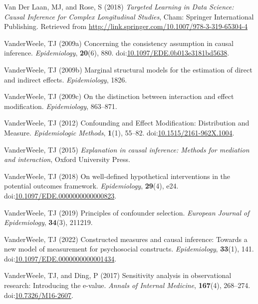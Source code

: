 \documentclass[
  singlecolumn]{article}
\newlength{\cslhangindent}
\newenvironment{CSLReferences}[2] %
 {\begin{list}{}{%
  \setlength{\itemindent}{0pt}
  \setlength{\leftmargin}{0pt}
  \setlength{\parsep}{0pt}
  \ifodd #1
   \setlength{\leftmargin}{\cslhangindent}
   \setlength{\itemindent}{-1\cslhangindent}
  \fi
  \setlength{\itemsep}{#2\baselineskip}}}
 {\end{list}}
\begin{document}
\begin{CSLReferences}{1}{0}
Van Der Laan, MJ, and Rose, S (2018) \emph{Targeted Learning in Data
Science: Causal Inference for Complex Longitudinal Studies}, Cham:
Springer International Publishing. Retrieved from
\url{http://link.springer.com/10.1007/978-3-319-65304-4}

VanderWeele, TJ (2009a) Concerning the consistency assumption in causal
inference. \emph{Epidemiology}, \textbf{20}(6), 880.
doi:\href{https://doi.org/10.1097/EDE.0b013e3181bd5638}{10.1097/EDE.0b013e3181bd5638}.

VanderWeele, TJ (2009b) Marginal structural models for the estimation of
direct and indirect effects. \emph{Epidemiology}, 1826.

VanderWeele, TJ (2009c) On the distinction between interaction and
effect modification. \emph{Epidemiology}, 863--871.

VanderWeele, TJ (2012) Confounding and Effect Modification: Distribution
and Measure. \emph{Epidemiologic Methods}, \textbf{1}(1), 55--82.
doi:\href{https://doi.org/10.1515/2161-962X.1004}{10.1515/2161-962X.1004}.

VanderWeele, TJ (2015) \emph{Explanation in causal inference: Methods
for mediation and interaction}, Oxford University Press.

VanderWeele, TJ (2018) On well-defined hypothetical interventions in the
potential outcomes framework. \emph{Epidemiology}, \textbf{29}(4), e24.
doi:\href{https://doi.org/10.1097/EDE.0000000000000823}{10.1097/EDE.0000000000000823}.

VanderWeele, TJ (2019) Principles of confounder selection.
\emph{European Journal of Epidemiology}, \textbf{34}(3), 211219.

VanderWeele, TJ (2022) Constructed measures and causal inference:
Towards a new model of measurement for psychosocial constructs.
\emph{Epidemiology}, \textbf{33}(1), 141.
doi:\href{https://doi.org/10.1097/EDE.0000000000001434}{10.1097/EDE.0000000000001434}.

VanderWeele, TJ, and Ding, P (2017) Sensitivity analysis in
observational research: Introducing the e-value. \emph{Annals of
Internal Medicine}, \textbf{167}(4), 268--274.
doi:\href{https://doi.org/10.7326/M16-2607}{10.7326/M16-2607}.


\end{CSLReferences}
\end{document}

